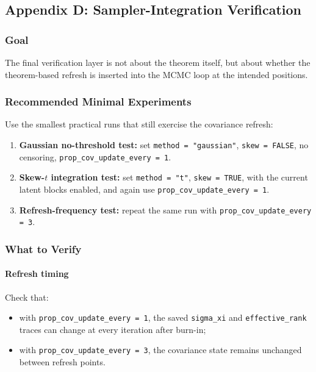 \documentclass[11pt]{article}
\begin{document}
\subsection{Appendix D: Sampler-Integration Verification}

\subsubsection{Goal}

The final verification layer is not about the theorem itself, but about whether
the theorem-based refresh is inserted into the MCMC loop at the intended
positions.

\subsubsection{Recommended Minimal Experiments}

Use the smallest practical runs that still exercise the covariance refresh:

\begin{enumerate}[label=\arabic*.]
\item \textbf{Gaussian no-threshold test:}
set \texttt{method = "gaussian"}, \texttt{skew = FALSE}, no censoring,
\texttt{prop\_cov\_update\_every = 1}.
\item \textbf{Skew-$t$ integration test:}
set \texttt{method = "t"}, \texttt{skew = TRUE}, with the current latent blocks
enabled, and again use \texttt{prop\_cov\_update\_every = 1}.
\item \textbf{Refresh-frequency test:}
repeat the same run with \texttt{prop\_cov\_update\_every = 3}.
\end{enumerate}

\subsubsection{What to Verify}

\paragraph{Refresh timing}
Check that:
\begin{itemize}
\item with \texttt{prop\_cov\_update\_every = 1}, the saved
\texttt{sigma\_xi} and \texttt{effective\_rank} traces can change at every
iteration after burn-in;
\item with \texttt{prop\_cov\_update\_every = 3}, the covariance state remains
unchanged between refresh points.
\end{itemize}
\end{document}
